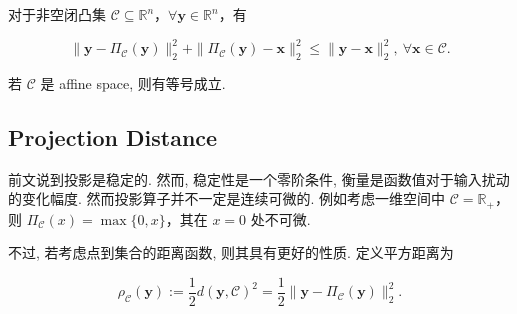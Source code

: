 \begin{colblock}
对于非空闭凸集 $\mathcal{C} \subseteq \mathbb{R}^n$，$\forall \bm{y} \in \mathbb{R}^n$，有

\[
\|\bm{y}-\Pi_{\mathcal{C}}(\bm{y})\|_2^2 + \|\Pi_{\mathcal{C}}(\bm{y}) - \bm{x}\|_2^2 \leq \|\bm{y}-\bm{x}\|_2^2,~ \forall \bm{x} \in \mathcal{C}.
\]

若 $\mathcal{C}$ 是 affine space, 则有等号成立.

\end{colblock}

\subsection{Projection Distance}

前文说到投影是稳定的. 然而, 稳定性是一个零阶条件, 衡量是函数值对于输入扰动的变化幅度. 然而投影算子并不一定是连续可微的. 例如考虑一维空间中 $\mathcal{C} = \mathbb{R}_+$，则 $\Pi_{\mathcal{C}}(x) = \max\{0, x\}$，其在 $x=0$ 处不可微.


\begin{defblock}
不过, 若考虑点到集合的距离函数, 则其具有更好的性质. 定义平方距离为

\[
\rho_{\mathcal{C}}(\bm{y}) := \frac12 d(\bm{y}, \mathcal{C})^2 = \frac12 \|\bm{y}-\Pi_{\mathcal{C}}(\bm{y})\|_2^2.
\]

\end{defblock}


